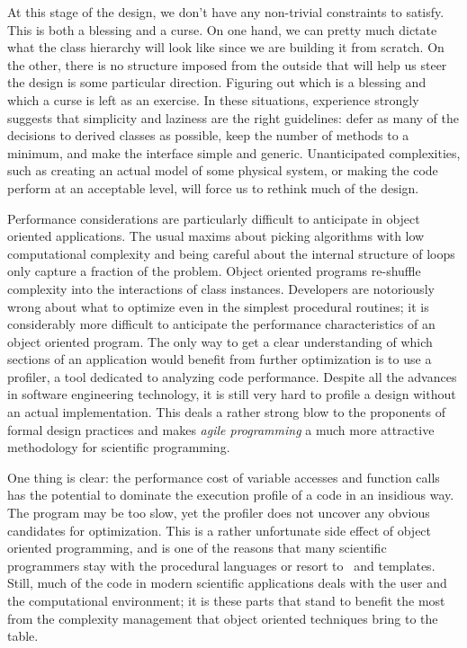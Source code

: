 At this stage of the design, we don't have any non-trivial constraints to satisfy. This is both
a blessing and a curse. On one hand, we can pretty much dictate what the class hierarchy will
look like since we are building it from scratch. On the other, there is no structure imposed
from the outside that will help us steer the design is some particular direction. Figuring out
which is a blessing and which a curse is left as an exercise. In these situations, experience
strongly suggests that simplicity and laziness are the right guidelines: defer as many of the
decisions to derived classes as possible, keep the number of methods to a minimum, and make the
interface simple and generic. Unanticipated complexities, such as creating an actual model of
some physical system, or making the code perform at an acceptable level, will force us to
rethink much of the design.

Performance considerations are particularly difficult to anticipate in object oriented
applications. The usual maxims about picking algorithms with low computational complexity and
being careful about the internal structure of loops only capture a fraction of the problem.
Object oriented programs re-shuffle complexity into the interactions of class instances.
Developers are notoriously wrong about what to optimize even in the simplest procedural
routines; it is considerably more difficult to anticipate the performance characteristics of an
object oriented program. The only way to get a clear understanding of which sections of an
application would benefit from further optimization is to use a profiler, a tool dedicated to
analyzing code performance. Despite all the advances in software engineering technology, it is
still very hard to profile a design without an actual implementation. This deals a rather
strong blow to the proponents of formal design practices\supercite{uml} and makes {\em agile
  programming}\supercite{agile} a much more attractive methodology for scientific programming.

One thing is clear: the performance cost of variable accesses and function calls has the
potential to dominate the execution profile of a code in an insidious way. The program may be
too slow, yet the profiler does not uncover any obvious candidates for optimization. This is a
rather unfortunate side effect of object oriented programming, and is one of the reasons that
many scientific programmers stay with the procedural languages or resort to \cpp\ and
templates. Still, much of the code in modern scientific applications deals with the user and
the computational environment; it is these parts that stand to benefit the most from the
complexity management that object oriented techniques bring to the table.

